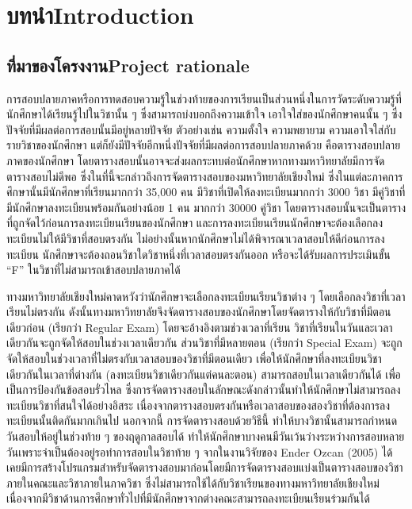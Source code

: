 \chapter{\ifcpe บทนำ\else Introduction\fi}

\section{\ifcpe ที่มาของโครงงาน\else Project rationale\fi}
\label{sec:project_rationale}


การสอบปลายภาคหรือการทดสอบความรู้ในช่วงท้ายของการเรียนเป็นส่วนหนึ่งในการวัดระดับความรู้ที่นักศึกษาได้เรียนรู้ไปในวิชานั้น ๆ
ซึ่งสามารถบ่งบอกถึงความเข้าใจ เอาใจใส่ของนักศึกษาคนนั้น ๆ ซึ่งปัจจัยที่มีผลต่อการสอบนั้นมีอยู่หลายปัจจัย
ตัวอย่างเช่น ความตั้งใจ ความพยายาม ความเอาใจใส่กับรายวิชาของนักศึกษา
แต่ก็ยังมีปัจจัยอีกหนึ่งปัจจัยที่มีผลต่อการสอบปลายภาคด้วย คือตารางสอบปลายภาคของนักศึกษา
โดยตารางสอบนั้นอาจจะส่งผลกระทบต่อนักศึกษาหากทางมหาวิทยาลัยมีการจัดตารางสอบไม่ดีพอ
ซึ่งในที่นี้จะกล่าวถึงการจัดตารางสอบของมหาวิทยาลัยเชียงใหม่ ซึ่งในแต่ละภาคการศึกษานั้นมีนักศึกษาที่เรียนมากกว่า 35,000 คน 
มีวิชาที่เปิดให้ลงทะเบียนมากกว่า 3000 วิชา มีคู่วิชาที่มีนักศึกษาลงทะเบียนพร้อมกันอย่างน้อย 1 คน มากกว่า 30000 คู่วิชา 
โดยตารางสอบนั้นจะเป็นตารางที่ถูกจัดไว้ก่อนการลงทะเบียนเรียนของนักศึกษา 
และการลงทะเบียนเรียนนักศึกษาจะต้องเลือกลงทะเบียนไม่ให้มีวิชาที่สอบตรงกัน
ไม่อย่างนั้นหากนักศึกษาไม่ได้พิจารณาเวลาสอบให้ดีก่อนการลงทะเบียน นักศึกษาจะต้องถอนวิชาใดวิชาหนึ่งที่เวลาสอบตรงกันออก
หรือจะได้รับผลการประเมินขั้น ``F'' ในวิชาที่ไม่สามารถเข้าสอบปลายภาคได้


ทางมหาวิทยาลัยเชียงใหม่คาดหวังว่านักศึกษาจะเลือกลงทะเบียนเรียนวิชาต่าง ๆ
โดยเลือกลงวิชาที่เวลาเรียนไม่ตรงกัน ดังนั้นทางมหาวิทยาลัยจึงจัดตารางสอบของนักศึกษาโดยจัดตารางให้กับวิชาที่มีตอนเดียวก่อน
(เรียกว่า Regular Exam) โดยจะอ้างอิงตามช่วงเวลาที่เรียน วิชาที่เรียนในวันและเวลาเดียวกันจะถูกจัดให้สอบในช่วงเวลาเดียวกัน
ส่วนวิชาที่มีหลายตอน (เรียกว่า Special Exam) จะถูกจัดให้สอบในช่วงเวลาที่ไม่ตรงกับเวลาสอบของวิชาที่มีตอนเดียว
เพื่อให้นักศึกษาที่ลงทะเบียนวิชาเดียวกันในเวลาที่ต่างกัน  (ลงทะเบียนวิชาเดียวกันแต่คนละตอน) สามารถสอบในเวลาเดียวกันได้
เพื่อเป็นการป้องกันข้อสอบรั่วไหล ซึ่งการจัดตารางสอบในลักษณะดังกล่าวนั้นทําให้นักศึกษาไม่สามารถลงทะเบียนวิชาที่สนใจได้อย่างอิสระ
เนื่องจากตารางสอบตรงกันหรือเวลาสอบของสองวิชาที่ต้องการลงทะเบียนนั้นติดกันมากเกินไป 
นอกจากนี้ การจัดตารางสอบด้วยวิธีนี้ ทำให้บางวิชานั้นสามารถกําหนดวันสอบให้อยู่ในช่วงท้าย ๆ ของฤดูกาลสอบได้ 
ทําให้นักศึกษาบางคนมีวันเว้นว่างระหว่างการสอบหลายวันเพราะจําเป็นต้องอยู่รอทำการสอบในวิชาท้าย ๆ
จากในงานวิจัยของ Ender Ozcan (2005) ได้เคยมีการสร้างโปรแกรมสำหรับจัดตารางสอบมาก่อนโดยมีการจัดตารางสอบแบ่งเป็นตารางสอบของวิชาภายในคณะและวิชาภายในภาควิชา 
ซึ่งไม่สามารถใช้ได้กับวิชาเรียนของทางมหาวิทยาลัยเชียงใหม่ 
เนื่องจากมีวิชาด้านการศึกษาทั่วไปที่มีนักศึกษาจากต่างคณะสามารถลงทะเบียนเรียนร่วมกันได้


